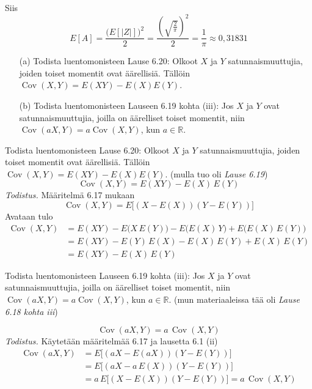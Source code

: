 \documentclass[12pt,a4paper]{article}
\begin{document}
Siis
\[
E[A]
=\frac{\bigl(E[|Z|]\bigr)^2}2
=\frac{\left(\sqrt{\frac{2}{\pi}}\right)^{2}}2
=\frac{1}{\pi}\approx 0{,}31831
\]






\pagebreak
{}
\begin{enumerate}
    \item [(a)] Todista luentomonisteen Lause 6.20: Olkoot $X$ ja $Y$ satunnaismuuttujia, joiden toiset momentit ovat äärellisiä. Tällöin
$\operatorname{Cov}(X,Y)=E(XY)-E(X)E(Y)$.
    \item[(b)] Todista luentomonisteen Lauseen 6.19 kohta (iii): Jos $X$ ja $Y$ ovat 
satunnaismuuttujia, joilla on äärelliset toiset momentit, niin
$\operatorname{Cov}(aX,Y)=a\operatorname{Cov}(X,Y)$, kun $a \in \mathbb{R}$.
\end{enumerate}


\begin{kohta}
  \item Todista luentomonisteen Lause 6.20: Olkoot $X$ ja $Y$ satunnaismuuttujia, joiden toiset momentit ovat äärellisiä. Tällöin
$\operatorname{Cov}(X,Y)=E(XY)-E(X)E(Y)$. (mulla tuo oli \emph{Lause 6.19})
  \[
    \operatorname{Cov}(X,Y)=E(XY)-E(X)\,E(Y)
  \]
  \textit{Todistus.} Määritelmä 6.17 mukaan
  \[
    \operatorname{Cov}(X,Y)=E\big[(X-E(X))(Y-E(Y))\big]
  \]
  Avataan tulo
  \[
  \begin{aligned}
    \operatorname{Cov}(X,Y)
    &= E(XY) - E\!\big(X\,E(Y)\big) - E\!\big(E(X)\,Y\big) + E\!\big(E(X)\,E(Y)\big)\\
    &= E(XY) - E(Y)\,E(X) - E(X)\,E(Y) + E(X)\,E(Y)\\
    &= E(XY) - E(X)\,E(Y)
  \end{aligned}
  \]

  \item Todista luentomonisteen Lauseen 6.19 kohta (iii): Jos $X$ ja $Y$ ovat 
satunnaismuuttujia, joilla on äärelliset toiset momentit, niin
$\operatorname{Cov}(aX,Y)=a\operatorname{Cov}(X,Y)$, kun $a \in \mathbb{R}$.
(mun materiaaleissa tää oli \linebreak\emph{Lause 6.18 kohta iii})
  
  \[
    \operatorname{Cov}(aX,Y)=a\,\operatorname{Cov}(X,Y)
  \]
  \textit{Todistus.} Käytetään määritelmää 6.17 ja lausetta 6.1 (ii)
  \[
  \begin{aligned}
    \operatorname{Cov}(aX,Y)
    &= E\big[(aX-E(aX))(Y-E(Y))\big]\\
    &= E\big[(aX-a\,E(X))(Y-E(Y))\big]\\
    &= a\,E\big[(X-E(X))(Y-E(Y))\big]
     = a\,\operatorname{Cov}(X,Y)
  \end{aligned}
  \]
\end{kohta}
\end{document}
